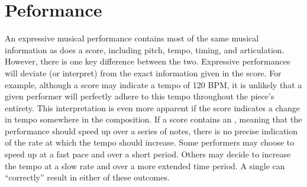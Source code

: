 


\section{Peformance}\label{sec:performance}
An expressive musical performance contains most of the same musical information as does a score, including pitch, tempo, timing, and articulation. However, there is one key difference between the two. Expressive performances will deviate (or interpret) from the exact information given in the score. For example, although a score may indicate a tempo of 120 BPM, it is unlikely that a given performer will perfectly adhere to this tempo throughout the piece's entirety. This interpretation is even more apparent if the score indicates a change in tempo somewhere in the composition. If a score contains an , meaning that the performance should speed up over a series of notes, there is no precise indication of the rate at which the tempo should increase. Some performers may choose to speed up at a fast pace and over a short period. Others may decide to increase the tempo at a slow rate and over a more extended time period. A single  can ``correctly'' result in either of these outcomes. 

